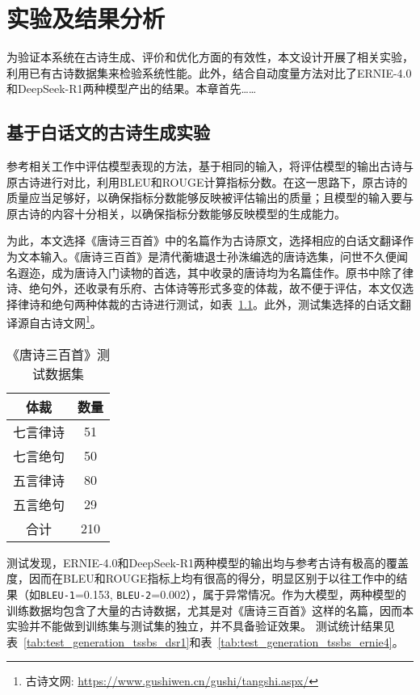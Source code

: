 
\chapter{实验及结果分析}

为验证本系统在古诗生成、评价和优化方面的有效性，本文设计开展了相关实验，利用已有古诗数据集来检验系统性能。此外，结合自动度量方法对比了ERNIE-4.0和DeepSeek-R1两种模型产出的结果。本章首先……

\section{基于白话文的古诗生成实验}

参考相关工作中评估模型表现的方法，基于相同的输入，将评估模型的输出古诗与原古诗进行对比，利用BLEU和ROUGE计算指标分数。在这一思路下，原古诗的质量应当足够好，以确保指标分数能够反映被评估输出的质量；且模型的输入要与原古诗的内容十分相关，以确保指标分数能够反映模型的生成能力。

为此，本文选择《唐诗三百首》中的名篇作为古诗原文，选择相应的白话文翻译作为文本输入。《唐诗三百首》是清代蘅塘退士孙洙编选的唐诗选集，问世不久便闻名遐迩，成为唐诗入门读物的首选，其中收录的唐诗均为名篇佳作。原书中除了律诗、绝句外，还收录有乐府、古体诗等形式多变的体裁，故不便于评估，本文仅选择律诗和绝句两种体裁的古诗进行测试，如表~\ref{tab:test_generation_data}。此外，测试集选择的白话文翻译源自古诗文网\footnote{古诗文网: \url{https://www.gushiwen.cn/gushi/tangshi.aspx/}}。


\begin{table}[ht]
    \centering
    \caption{《唐诗三百首》测试数据集}
    \label{tab:test_generation_data}
    \begin{tabular}{|c|c|}
      \hline
      \bf{体裁}& \bf{数量} \\
      \hline
      七言律诗& 51\\
      \hline
      七言绝句& 50\\
      \hline
      五言律诗& 80\\
      \hline
      五言绝句& 29\\
      \hline
      合计& 210\\
      \hline
    \end{tabular}
  \end{table}

测试发现，ERNIE-4.0和DeepSeek-R1两种模型的输出均与参考古诗有极高的覆盖度，因而在BLEU和ROUGE指标上均有很高的得分，明显区别于以往工作中的结果（如\verb|BLEU-1|=0.153, \verb|BLEU-2|=0.002），属于异常情况。作为大模型，两种模型的训练数据均包含了大量的古诗数据，尤其是对《唐诗三百首》这样的名篇，因而本实验并不能做到训练集与测试集的独立，并不具备验证效果。
测试统计结果见表~\ref{tab:test_generation_tssbs_dsr1}和表~\ref{tab:test_generation_tssbs_ernie4}。


